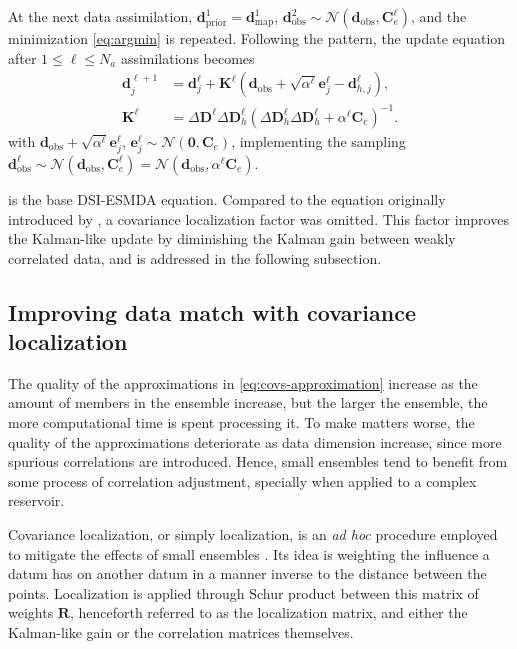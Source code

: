 At the next data assimilation, 
$\mathbf{d}^1_\text{prior} = \mathbf{d}^1_\text{map}$,
$\mathbf{d}^2_\text{obs} \sim \mathcal{N}(\mathbf{d}_\text{obs}, \mathbf{C}^\ell_e)$,
and the minimization \cref{eq:argmin} is repeated.
%
Following the pattern,
the update equation after $1\leq \ell\leq N_a$ assimilations becomes
%
\begin{subequations}
    \begin{alignat}{4}
        \mathbf{d}_j^{\ell+1} 
        &=
        \mathbf{d}_j^\ell + \mathbf{K}^\ell
        (\mathbf{d}_\text{obs} + \sqrt{\alpha^\ell}\mathbf{e}_j^\ell - \mathbf{d}_{h,j}^\ell),
        \\
        \mathbf{K}^\ell 
        &=  
        \Delta\mathbf{D}^\ell\Delta\mathbf{D}^\ell_h
        (\Delta\mathbf{D}^\ell_h\Delta\mathbf{D}^\ell_h + \alpha^\ell\mathbf{C}_e)^{-1}.
        \label{eq:kalman-gain-l}
    \end{alignat}
\label{eq:iteration_dsiesmda-no-loc}
\end{subequations}
%
with $\mathbf{d}_\text{obs} + \sqrt{\alpha^\ell}\mathbf{e}_j^\ell$, 
$\mathbf{e}^\ell_j \sim \mathcal{N}(\mathbf{0}, \mathbf{C}_e)$, 
implementing the sampling 
$\mathbf{d}_\text{obs}^\ell \sim 
\mathcal{N}(\mathbf{d}_\text{obs}, \mathbf{C}^\ell_e) =
\mathcal{N}(\mathbf{d}_\text{obs}, \alpha^\ell\mathbf{C}_e)$.

 is the base DSI-ESMDA equation.
Compared to the equation originally introduced by ,
a covariance localization factor was omitted. 
This factor improves the Kalman-like update by diminishing the Kalman gain between weakly correlated data,
and is addressed in the following subsection. 

\subsection{Improving data match with covariance localization}
The quality of the approximations in \cref{eq:covs-approximation} 
increase as the amount of members in the ensemble increase, 
but the larger the ensemble, the more computational time is spent processing it.
%
To make matters worse, the quality of the approximations deteriorate as data dimension increase,
since more spurious correlations are introduced.
%
Hence, small ensembles tend to benefit from some process of correlation adjustment,
specially when applied to a complex reservoir. 

Covariance localization, or simply localization, 
is an \emph{ad hoc} procedure employed to mitigate the effects of small ensembles 
\cite[section 7.5]{Emerick:2025}.
%
Its idea is weighting the influence a datum has on another datum 
in a manner inverse to the distance between the points.
%
Localization is applied through Schur product between this matrix of weights $\mathbf{R}$,
henceforth referred to as the localization matrix,
and either the Kalman-like gain or the correlation matrices themselves.

